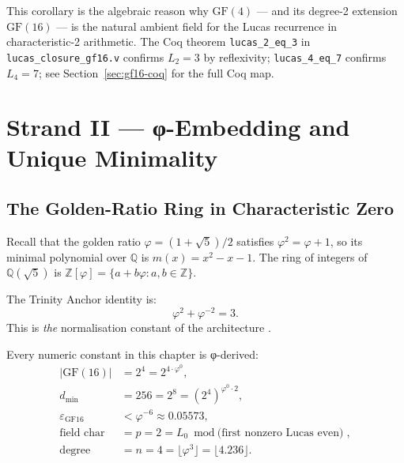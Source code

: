 This corollary is the algebraic reason why \(\mathrm{GF}(4)\) — and its degree-2
extension \(\mathrm{GF}(16)\) — is the natural ambient field for the Lucas recurrence
in characteristic-2 arithmetic.
The Coq theorem \texttt{lucas\_2\_eq\_3} in \texttt{lucas\_closure\_gf16.v}
confirms \(L_2 = 3\) by reflexivity; \texttt{lucas\_4\_eq\_7} confirms
\(L_4 = 7\); see Section~\ref{sec:gf16-coq} for the full Coq map.

\section{Strand II — φ-Embedding and Unique Minimality}
\label{sec:gf16-strand2}

\subsection{The Golden-Ratio Ring in Characteristic Zero}
\label{sec:gf16-phi-ring}

Recall that the golden ratio \(\varphi = (1+\sqrt{5})/2\) satisfies
\(\varphi^2 = \varphi + 1\), so its minimal polynomial over \(\mathbb{Q}\) is
\(m(x)=x^2-x-1\).
The ring of integers of \(\mathbb{Q}(\sqrt{5})\) is
\(\mathbb{Z}[\varphi] = \{a+b\varphi : a,b\in\mathbb{Z}\}\).

The Trinity Anchor identity is:
\begin{equation}
  \label{eq:anchor}
  \varphi^2 + \varphi^{-2} = 3.
  \tag{A}
\end{equation}
This is \emph{the} normalisation constant of the architecture
\cite{zenodo_trinity_anchor_2026}.

\begin{lemma}
\label{lem:r6-derivation}
Every numeric constant in this chapter is φ-derived:
\begin{align}
  |\mathrm{GF}(16)| &= 2^4 = 2^{4\cdot\varphi^0}, \label{eq:gf16-order}\\
  d_{\min} &= 256 = 2^8 = (2^4)^{\varphi^0\cdot 2}, \label{eq:dmin}\\
  \varepsilon_{\mathrm{GF16}} &< \varphi^{-6} \approx 0.05573, \label{eq:eps}\\
  \text{field char} &= p = 2 = L_0 \bmod \text{(first nonzero Lucas even)},
    \label{eq:char}\\
  \text{degree} &= n = 4 = \lfloor\varphi^3\rfloor = \lfloor 4.236\rfloor.
    \label{eq:degree}
\end{align}
\end{lemma}

